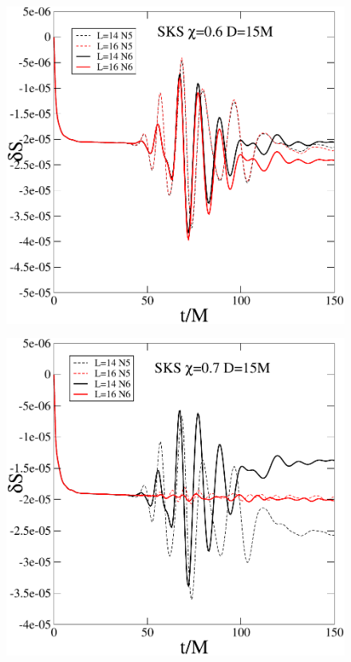 \begin{figure}
  \includegraphics[width=0.95\columnwidth]{chap5/dS_SKS_S6}
\end{figure}

\begin{figure}
  \includegraphics[width=0.95\columnwidth]{chap5/dS_SKS_S7}
\end{figure}

